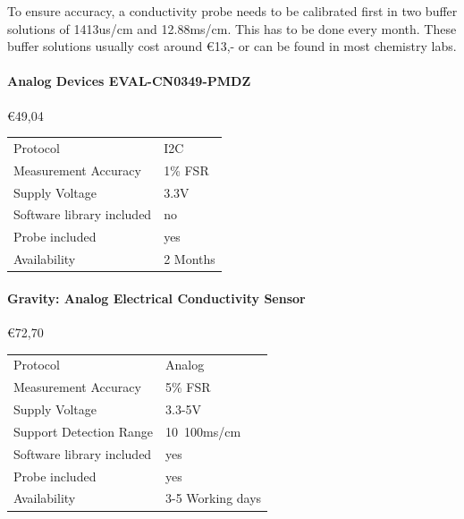 To ensure accuracy, a conductivity probe needs to be calibrated first in two buffer solutions of 1413us/cm and 12.88ms/cm. \cite{DFR0300H} This has to be done every month. These buffer solutions usually cost around €13,- or can be found in most chemistry labs.

\paragraph{Analog Devices EVAL-CN0349-PMDZ}\mbox{€49,04} \cite{CN0349}
\begin{table}[h!]
	\centering
	\quad
	\begin{tabular}{| l | l |}
    \hline
    Protocol & I2C\\
    Measurement Accuracy &  1\% FSR\\
    Supply Voltage & 3.3V\\
    Software library included & no \\
    Probe included & yes \\
    Availability & 2 Months \\
    \hline
	\end{tabular}
\end{table}

\paragraph{Gravity: Analog Electrical Conductivity Sensor}\mbox{€72,70} \cite{DFR0300H}
\begin{table}[h!]
	\centering
	\quad
	\begin{tabular}{| l | l |}
    \hline
    Protocol & Analog\\
    Measurement Accuracy &  5\% FSR\\
    Supply Voltage & 3.3-5V\\
    Support Detection Range & 10~100ms/cm\\
    Software library included & yes \\
    Probe included & yes \\
    Availability & 3-5 Working days \\
    \hline
	\end{tabular}
\end{table}